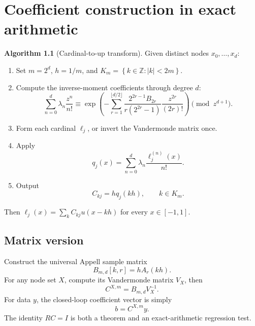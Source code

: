 \documentclass[11pt,oneside]{book}
\theoremstyle{definition}
\newtheorem{algorithm}[theorem]{Algorithm}
\theoremstyle{remark}
\newcommand{\Z}{\mathbb Z}
\newcommand{\set}[1]{\left\{#1\right\}}
\begin{document}
\chapter{Coefficient construction in exact arithmetic}
\label{app:algorithm}

\begin{algorithm}[Cardinal-to-up transform]
\label{alg:cardinal-to-up}
Given distinct nodes \(x_0,\ldots,x_d\):
\begin{enumerate}
\item Set \(m=2^d\), \(h=1/m\), and \(K_m=\set{k\in\Z:|k|<2m}\).
\item Compute the inverse-moment coefficients through degree \(d\):
\[
 \sum_{n=0}^{d}\lambda_n\frac{z^n}{n!}
 \equiv
 \exp\!\left(-\sum_{r=1}^{\lfloor d/2\rfloor}
 \frac{2^{2r-1}B_{2r}}{r(2^{2r}-1)}
 \frac{z^{2r}}{(2r)!}\right)
 \pmod{z^{d+1}}.
\]
\item Form each cardinal \(\ell_j\), or invert the Vandermonde matrix once.
\item Apply
\[
 q_j(x)=\sum_{n=0}^{d}\lambda_n\frac{\ell_j^{(n)}(x)}{n!}.
\]
\item Output
\[
 C_{kj}=h q_j(kh),\qquad k\in K_m.
\]
\end{enumerate}
Then \(\ell_j(x)=\sum_kC_{kj}u(x-kh)\) for every \(x\in[-1,1]\).
\end{algorithm}

\section{Matrix version}
Construct the universal Appell sample matrix
\[
 B_{m,d}[k,r]=hA_r(kh).
\]
For any node set \(X\), compute its Vandermonde matrix \(V_X\), then
\[
 C^{X,m}=B_{m,d}V_X^{-1}.
\]
For data \(y\), the closed-loop coefficient vector is simply
\[
 b=C^{X,m}y.
\]
The identity \(RC=I\) is both a theorem and an exact-arithmetic regression test.
\end{document}
